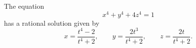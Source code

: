 \begin{proposition}
    The equation
\[
    x^4+y^4+4z^4=1
\]
    has a rational solution given by
\[
    x=\frac{t^4-2}{t^4+2},\qquad y=\frac{2t^3}{t^4+2},\qquad z=\frac{2t}{t^4+2}.
\]
\end{proposition}
